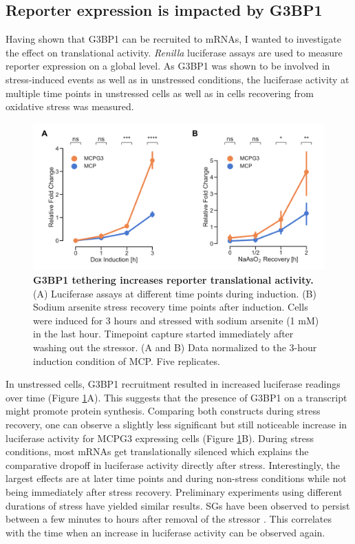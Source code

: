 \subsection{Reporter expression is impacted by G3BP1} \label{mcp_luciferase}

Having shown that G3BP1 can be recruited to mRNAs, I wanted to investigate the effect on translational activity. \textit{Renilla} luciferase assays are used to measure reporter expression on a global level.
As G3BP1 was shown to be involved in stress-induced events as well as in unstressed conditions, the luciferase activity at multiple time points in unstressed cells as well as in cells recovering from oxidative stress was measured.

\begin{figure}[t!]
    \centering
    \includegraphics[width=\linewidth]{images/figure3}
    \caption{\textbf{G3BP1 tethering increases reporter translational activity.}
        (A) Luciferase assays at different time points during induction.
        (B) Sodium arsenite stress recovery time points after induction.
            Cells were induced for 3 hours and stressed with sodium arsenite (1 mM) in the last hour.
            Timepoint capture started immediately after washing out the stressor.
        (A and B) Data normalized to the 3-hour induction condition of MCP. Five replicates.   
    }
    \label{fig:mcp_luciferase}
\end{figure}

In unstressed cells, G3BP1 recruitment resulted in increased luciferase readings over time (Figure \ref{fig:mcp_luciferase}A).
This suggests that the presence of G3BP1 on a transcript might promote protein synthesis.
Comparing both constructs during stress recovery, one can observe a slightly less significant but still noticeable increase in luciferase activity for MCPG3 expressing cells (Figure \ref{fig:mcp_luciferase}B).
During stress conditions, most mRNAs get translationally silenced \cite{wilbertz_single-molecule_2019} which explains the comparative dropoff in luciferase activity directly after stress.
Interestingly, the largest effects are at later time points and during non-stress conditions while not being immediately after stress recovery.
Preliminary experiments using different durations of stress have yielded similar results.
SGs have been observed to persist between a few minutes to hours after removal of the stressor \cite{chen_relationships_2017, wilbertz_single-molecule_2019}.
This correlates with the time when an increase in luciferase activity can be observed again.


